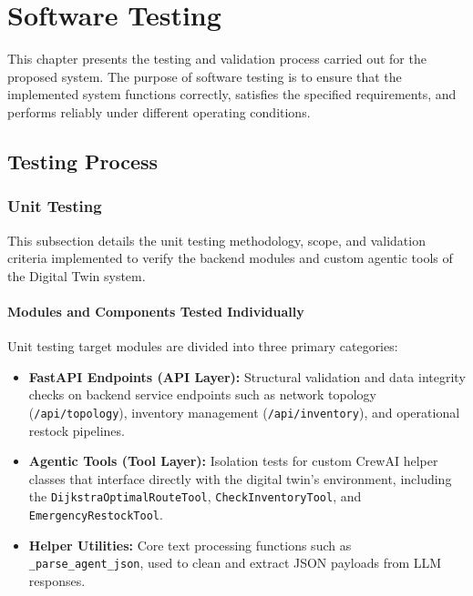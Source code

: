 \chapter[Software Testing]{Software Testing}
This chapter presents the testing and validation process carried out for the proposed system.
The purpose of software testing is to ensure that the implemented system functions correctly,
satisfies the specified requirements, and performs reliably under different operating
conditions.

\section[Testing Process]{Testing Process}
\subsection[Unit Testing]{Unit Testing}
This subsection details the unit testing methodology, scope, and validation criteria implemented to verify the backend modules and custom agentic tools of the Digital Twin system.

\subsubsection{Modules and Components Tested Individually}
Unit testing target modules are divided into three primary categories:
\begin{itemize}
    \item \textbf{FastAPI Endpoints (API Layer):} Structural validation and data integrity checks on backend service endpoints such as network topology (\texttt{/api/topology}), inventory management (\texttt{/api/inventory}), and operational restock pipelines.
    \item \textbf{Agentic Tools (Tool Layer):} Isolation tests for custom CrewAI helper classes that interface directly with the digital twin's environment, including the \texttt{DijkstraOptimalRouteTool}, \texttt{CheckInventoryTool}, and \texttt{EmergencyRestockTool}.
    \item \textbf{Helper Utilities:} Core text processing functions such as \texttt{\_parse\_agent\_json}, used to clean and extract JSON payloads from LLM responses.
\end{itemize}


